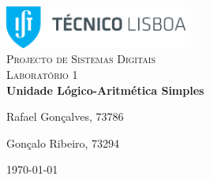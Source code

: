\begin{titlepage}

	\begin{center}

		\includegraphics[width=6cm]{./title}\\[3cm]

		\textsc{\LARGE Projecto de Sistemas Digitais}\\[1.5cm]

		\textsc{\Large Laboratório 1}\\[1.5cm]


		{ \huge \bfseries Unidade Lógico-Aritmética Simples \\[3cm] }


		\noindent
		\begin{minipage}{0.4\textwidth}
			\begin{flushleft} \large
				Rafael Gonçalves, 73786
			\end{flushleft}
		\end{minipage}
		\begin{minipage}{0.4\textwidth}
			\begin{flushright} \large
				Gonçalo Ribeiro, 73294
			\end{flushright}
		\end{minipage}

		\vfill

		{\large \today}


	\end{center}

\end{titlepage}